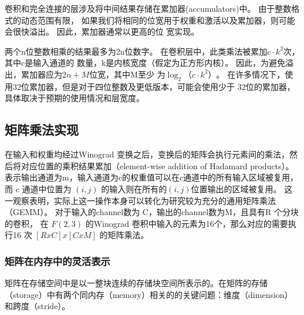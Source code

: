 卷积和完全连接的层涉及将中间结果存储在累加器(accumulators)中。 由于整数格式的动态范围有限，
如果我们将相同的位宽用于权重和激活以及累加器，则可能会很快溢出。 因此，累加器通常以更高的位
宽实现。

两个n位整数相乘的结果最多为2n位数字。 在卷积层中，此类乘法被累加$c·k^2$次，其中c是输入通道的
数量，k是内核宽度（假定为正方形内核）。 因此，为避免溢出，累加器应为$2n + M$位宽，其中M至少
为$\log_2（c⋅k^2）$。 在许多情况下，使用32位累加器，但是对于四位整数及更低版本，可能会使用少于
32位的累加器，具体取决于预期的使用情况和层宽度。

\subsection{矩阵乘法实现}

在输入和权重均经过Winograd 变换之后，变换后的矩阵会执行元素间的乘法，然后将对应位置的乘积结果累加（element-wise addition of Hadamard products）。
表示输出通道为m，输入通道为c的权重值可以在c通道中的所有输入区域被复用，
而 c 通道中位置为 $(i, j)$ 的输入则在所有的$(i,j )$位置输出的区域被复用。 这一观察表明，实际上这一操作本身可以转化为研究较为充分的通用矩阵乘法（GEMM）。
对于输入的channel数为 C，输出的channel数为M，且具有R 个分块的卷积， 在 $F(2, 3)$ 的Winograd 卷积中输入的元素为16个，那么对应的需要执行16 次 $[RxC]x[CxM] $
的矩阵乘法。


\subsubsection{矩阵在内存中的灵活表示}
矩阵在存储空间中是以一整块连续的存储块空间所表示的。在矩阵的存储（storage）中有两个同内存（memory）相关的的关键问题：维度（dimension）和跨度（stride）。

